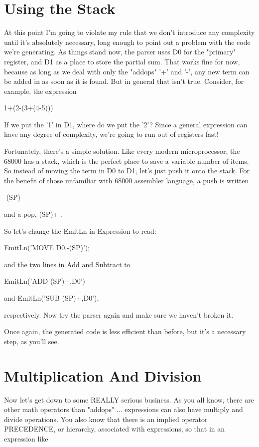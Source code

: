 \documentclass[float=false, crop=false]{standalone}
\begin{document}
\section{Using the Stack}

At this point I'm going to violate my rule that we don't introduce any
complexity until it's absolutely necessary, long enough to point out a problem
with the code we're generating. As things stand now, the parser uses D0 for the
"primary" register, and D1 as a place to store the partial sum. That works fine
for now, because as long as we deal with only the "addops" '+' and '-', any new
term can be added in as soon as it is found. But in general that isn't true.
Consider, for example, the expression

               1+(2-(3+(4-5)))

If we put the '1' in D1, where do we put the '2'? Since a general expression can
have any degree of complexity, we're going to run out of registers fast!

Fortunately, there's a simple solution. Like every modern microprocessor, the
68000 has a stack, which is the perfect place to save a variable number of
items. So instead of moving the term in D0 to D1, let's just push it onto the
stack. For the benefit of those unfamiliar with 68000 assembler language, a push
is written

               -(SP)

and a pop,     (SP)+ .


So let's change the EmitLn in Expression to read:

               EmitLn('MOVE D0,-(SP)');

and the two lines in Add and Subtract to

               EmitLn('ADD (SP)+,D0')

and            EmitLn('SUB (SP)+,D0'),

respectively. Now try the parser again and make sure we haven't broken it.

Once again, the generated code is less efficient than before, but it's a
necessary step, as you'll see.


\section{Multiplication And Division}

Now let's get down to some REALLY serious business. As you all know, there are
other math operators than "addops" ... expressions can also have multiply and
divide operations. You also know that there is an implied operator PRECEDENCE,
or hierarchy, associated with expressions, so that in an expression like
\end{document}
